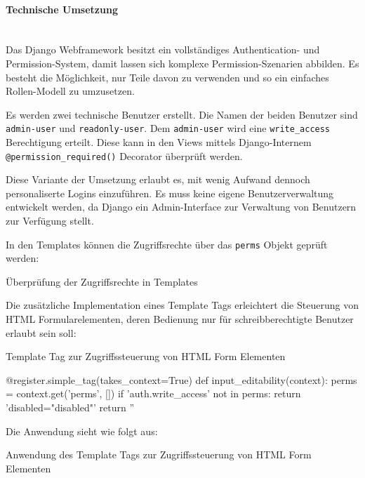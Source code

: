 \paragraph{Technische Umsetzung} \hspace{0pt} \\
Das Django Webframework besitzt ein vollständiges Authentication- und
Permission-System, damit lassen sich komplexe Permission-Szenarien
abbilden. Es besteht die Möglichkeit, nur Teile davon zu verwenden und
so ein einfaches Rollen-Modell zu umzusetzen.

Es werden zwei technische Benutzer
erstellt. Die Namen der beiden Benutzer sind 
 \texttt{admin-user} und \texttt{readonly-user}. Dem
\texttt{admin-user} wird eine \texttt{write\_access} Berechtigung erteilt. Diese
kann in den Views mittels Django-Internem \texttt{@permission\_required()}
Decorator überprüft werden.

Diese Variante der Umsetzung erlaubt es, mit wenig Aufwand dennoch personaliserte Logins
einzuführen. Es muss keine eigene Benutzerverwaltung entwickelt werden, da Django ein Admin-Interface zur Verwaltung von Benutzern zur Verfügung stellt.

In den Templates können die Zugriffsrechte über das \texttt{perms} Objekt geprüft werden:

\begin{listing}
\caption{Überprüfung der Zugriffsrechte in Templates}
\end{listing}

Die zusätzliche Implementation eines Template Tags erleichtert die Steuerung von
HTML Formularelementen, deren Bedienung nur für schreibberechtigte Benutzer
erlaubt sein soll:

\begin{listing}
\caption{Template Tag zur Zugriffssteuerung von HTML Form Elementen}
\begin{pythoncode}
@register.simple_tag(takes_context=True)
def input_editability(context):
    perms = context.get('perms', [])
    if 'auth.write_access' not in perms:
        return 'disabled="disabled"'
    return ''
\end{pythoncode}
\end{listing}
Die Anwendung sieht wie folgt aus:

\begin{listing}
\caption{Anwendung des Template Tags zur Zugriffssteuerung von HTML Form Elementen }
\end{listing}

